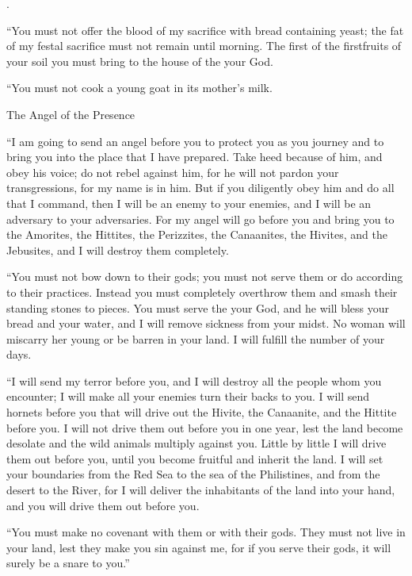 {{}.
\par }{\PP {}“You must not
offer
the blood
of my sacrifice with bread containing yeast;
the fat
of my festal
sacrifice
must
not
remain
until
morning.
The first
of the firstfruits
of your soil
you must bring
to the house
of the {}
your God.
\par }{\PP “You must not
cook
a young goat
in its mother’s
milk.
\par }{\SH The Angel of the Presence
\par }{\PP {}“I
am
going to send
an angel
before
you to protect
you as you journey
and to bring
you into
the place
that
I have prepared.
Take heed
because
of him, and obey
his voice;
do not
rebel
against him, for
he will not
pardon
your transgressions,
for
my name
is in him.
But if
you diligently
obey
him
and do
all
that
I command,
then I will be an enemy
to your enemies,
and I will be an adversary
to your adversaries.
For
my angel
will go
before
you and bring
you to
the Amorites,
the Hittites,
the Perizzites,
the Canaanites,
the Hivites,
and the Jebusites,
and I will destroy them completely.
\par }{\PP {}“You must not
bow
down to their gods;
you must not
serve
them or
do
according
to their practices.
Instead
you must
completely overthrow
them and smash their standing stones to pieces.
You must serve
the {}
your God,
and he will bless
your bread
and your water,
and I will remove
sickness
from your midst.
No
woman will miscarry
her young or be
barren
in your
land.
I will fulfill
the number
of your days.
\par }{\PP {}“I will send
my terror
before
you, and I will destroy
all
the people
whom
you encounter;
I will make
all
your enemies
turn their backs
to you.
I will send
hornets
before
you that will drive
out the Hivite,
the Canaanite,
and the
Hittite
before you.
I will not
drive
them out before
you in one
year,
lest
the land
become desolate
and the wild
animals
multiply
against you.
Little
by little
I will drive
them out before
you, until
you become fruitful
and inherit
the land.
I will set
your boundaries
from the Red
Sea
to
the sea
of the Philistines,
and from the desert
to
the River,
for
I will deliver
the
inhabitants
of the land
into your hand, and you will drive
them out before you.
\par }{\PP {}“You must make
no
covenant
with them or with their gods.
They must not
live
in your land,
lest
they make you sin
against me, for if
you serve
their gods,
it will surely
be
a snare to you.”


}
